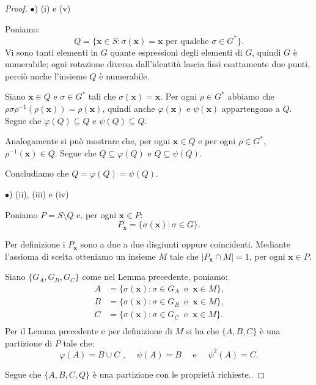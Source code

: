 \documentclass[a4paper,oneside,11pt]{book}
\theoremstyle{definition} \newtheorem{Def}{Definizione}
\theoremstyle{plain} \newtheorem{teo}{Teorema}
\theoremstyle{plain} \newtheorem{cor}[teo]{Corollario}
\theoremstyle{definition} \newtheorem{lem}[teo]{Lemma}
\theoremstyle{plain} \newtheorem{pro}[teo]{Proposizione}
\begin{document}
	\begin{proof}
		$\bullet$) (i) e (v)
		
		Poniamo:
		\begin{equation*}
			Q = \{\mathbf{x} \in S : \sigma(\mathbf{x}) = \mathbf{x} \text{ per qualche } \sigma \in G^*\} \text{.}
		\end{equation*}
		Vi sono tanti elementi in $G$ quante espressioni degli elementi di $G$, quindi $G$ è numerabile; ogni rotazione diversa dall'identità lascia fissi esattamente due punti, perciò anche l'insieme $Q$ è numerabile.
		
		Siano $\mathbf{x} \in Q$ e $\sigma \in G^*$ tali che $\sigma(\mathbf{x}) = \mathbf{x}$. Per ogni $\rho \in G^*$ abbiamo che $\rho\sigma\rho^{-1} (\rho(\mathbf{x})) = \rho(\mathbf{x})$, quindi anche $\varphi(\mathbf{x})$ e $\psi(\mathbf{x})$ appartengono a $Q$. Segue che $\varphi(Q) \subseteq Q$ e $\psi(Q) \subseteq Q$.
		
		Analogamente si può mostrare che, per ogni $\mathbf{x} \in Q$ e per ogni $\rho \in G^*$, $\rho^{-1}(\mathbf{x}) \in Q$. Segue che $Q \subseteq \varphi(Q)$ e $Q \subseteq \psi(Q)$.
		
		Concludiamo che $Q = \varphi(Q) = \psi(Q)$.
			
		$\bullet$) (ii), (iii) e (iv)
		
		Poniamo $P = S \setminus Q$ e, per ogni $\mathbf{x} \in P$:
		\begin{equation*}
			P_\mathbf{x} = \{\sigma(\mathbf{x}) : \sigma \in G\} \text{.}
		\end{equation*}
		
		Per definizione i $P_\mathbf{x}$ sono a due a due disgiunti oppure coincidenti. Mediante l'assioma di scelta otteniamo un insieme $M$ tale che $|P_\mathbf{x} \cap M| = 1$, per ogni $\mathbf{x} \in P$.
		
		Siano $\{G_A, G_B, G_C\}$ come nel Lemma precedente, poniamo:
		\begin{equation*}
			\begin{aligned}
				A &= \{\sigma(\mathbf{x}) : \sigma \in G_A\ \text{ e }\ \mathbf{x} \in M\} \text{,}\\
				B &= \{\sigma(\mathbf{x}) : \sigma \in G_B\ \text{ e }\ \mathbf{x} \in M\} \text{,}\\
				C &= \{\sigma(\mathbf{x}) : \sigma \in G_C\ \text{ e }\ \mathbf{x} \in M\} \text{.}\\
			\end{aligned}
		\end{equation*}
		Per il Lemma precedente e per definizione di $M$ si ha che $\{A, B, C\}$ è una partizione di $P$ tale che:
		\begin{equation*}
			\varphi(A) = B \cup C \text{ , } \quad \psi(A) = B\quad \text{ e } \quad \psi^2(A) = C \text{.}
		\end{equation*}
		
		Segue che $\{A, B, C, Q\}$ è una partizione con le proprietà richieste..
	\end{proof}
	
\end{document}
